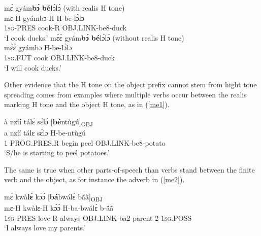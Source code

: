 \begin{exe} 
\ex\label{meta2}
\begin{xlist}
\ex\label{meta2a} 
  \glll     mɛ́ gyám{\bfseries bɔ́} {\bfseries bé}lɔ̀lɔ̀ \hfill (with realis H tone)  \\
          mɛ-H gyámbɔ-H H-be-lɔ̀lɔ \\
              1\textsc{sg}-PRES cook-R OBJ.LINK-be8-duck   \\
    \trans `I cook ducks.'
\ex\label{meta2b}
  \glll     mɛ̀ɛ̀  gyám{\bfseries bɔ̀} {\bfseries bé}lɔ̀lɔ̀ \hfill (without realis H tone) \\
            mɛ̀ɛ̀  gyámbɔ H-be-lɔ̀lɔ \\
              1\textsc{sg}.FUT cook OBJ.LINK-be8-duck   \\
    \trans `I will cook ducks.'
\end{xlist}
\end{exe}

Other evidence that the H tone on the object prefix cannot stem from hight tone spreading comes from examples where multiple verbs occur between the realis marking H tone and the object H tone, as in (\ref{me1}).

\begin{exe} 
\ex\label{me1} 
\glll à nzí{\bfseries í} tálɛ̀ sɛ́lɔ̀ [{\bfseries bé}ntùgú]\textsubscript{OBJ} \\
     a nzíí tálɛ sɛ́lɔ H-be-ntùgú \\
    1 PROG.PRES.R begin peel OBJ.LINK-be8-potato \\
\trans `S/he is starting to peel potatoes.'
\end{exe}

\noindent The same is true when other parts-of-speech than verbs stand between the finite verb and the object, as for instance the adverb in (\ref{me2}).

\begin{exe}
\ex\label{me2}
\glll mɛ́ kwà{\bfseries lɛ́}  kɔ́ɔ̀ [{\bfseries bá}bwálɛ̀ bã́ã̀]\textsubscript{OBJ} \\
        mɛ-H kwàlɛ-H  kɔ́ɔ̀ H-ba-bwálɛ̀ b-ã́ã̀ \\
    1\textsc{sg}-PRES love-R always OBJ.LINK-ba2-parent 2-1\textsc{sg}.POSS\\
\trans `I always love my parents.'
\end{exe}

